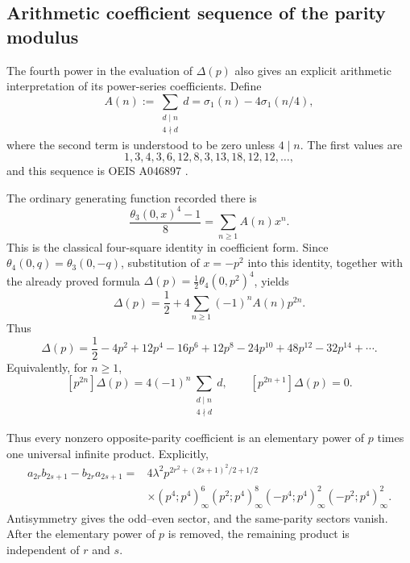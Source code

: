 \documentclass[11pt]{article}
\numberwithin{equation}{section}
\begin{document}
\subsection{Arithmetic coefficient sequence of the parity modulus}
The fourth power in the evaluation of $\Delta(p)$ also gives an explicit
arithmetic interpretation of its power-series coefficients.  Define
\begin{equation}
\boxed{
A(n):=\sum_{\substack{d\mid n\\4\nmid d}}d
=\sigma_1(n)-4\sigma_1(n/4),
}
\end{equation}
where the second term is understood to be zero unless $4\mid n$.  The first
values are
\begin{equation}
1,3,4,3,6,12,8,3,13,18,12,12,\ldots,
\end{equation}
and this sequence is OEIS A046897 \cite{OEISA046897}.

The ordinary generating function recorded there is
\begin{equation}
\boxed{
\frac{\theta_3(0,x)^4-1}{8}=\sum_{n\geq1}A(n)x^n.
}
\end{equation}
This is the classical four-square identity in coefficient form.  Since
$\theta_4(0,q)=\theta_3(0,-q)$, substitution of $x=-p^2$ into this identity,
together with the already proved formula
$\Delta(p)=\tfrac12\theta_4(0,p^2)^4$, yields
\begin{equation}
\boxed{
\Delta(p)=\frac12+4\sum_{n\geq1}(-1)^nA(n)p^{2n}.
}
\end{equation}
Thus
\begin{equation}
\Delta(p)=\frac12-4p^2+12p^4-16p^6+12p^8-24p^{10}
+48p^{12}-32p^{14}+\cdots.
\end{equation}
Equivalently, for $n\geq1$,
\begin{equation}
\boxed{
[p^{2n}]\Delta(p)=4(-1)^n
\sum_{\substack{d\mid n\\4\nmid d}}d,
\qquad [p^{2n+1}]\Delta(p)=0.
}
\end{equation}

Thus every nonzero opposite-parity coefficient is an elementary power of
$p$ times one universal infinite product.  Explicitly,
\begin{equation}
\boxed{
\begin{aligned}
a_{2r}b_{2s+1}-b_{2r}a_{2s+1}
={}&4\lambda^2p^{2r^2+(2s+1)^2/2+1/2}\\
&\times(p^4;p^4)_\infty^6(p^2;p^4)_\infty^8
(-p^4;p^4)_\infty^2(-p^2;p^4)_\infty^2.
\end{aligned}}
\end{equation}
Antisymmetry gives the odd--even sector, and the same-parity sectors vanish.
After the elementary power of $p$ is removed, the remaining product is
independent of $r$ and $s$.
\end{document}
